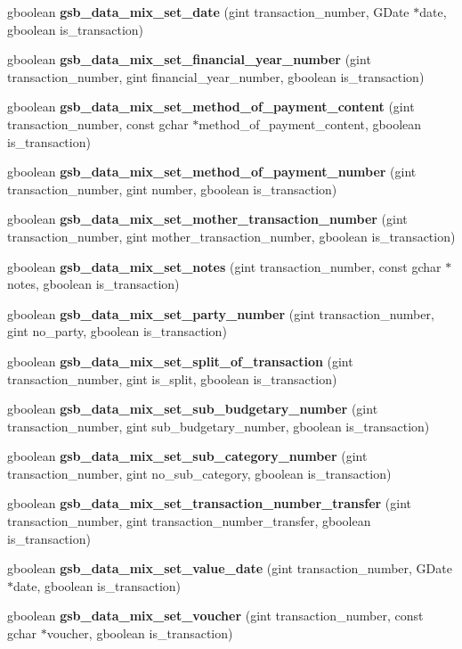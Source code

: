 \begin{DoxyCompactItemize}
\item 
gboolean {\bf gsb\_\-data\_\-mix\_\-set\_\-date} (gint transaction\_\-number, GDate $\ast$date, gboolean is\_\-transaction)
\item 
gboolean {\bf gsb\_\-data\_\-mix\_\-set\_\-financial\_\-year\_\-number} (gint transaction\_\-number, gint financial\_\-year\_\-number, gboolean is\_\-transaction)
\item 
gboolean {\bf gsb\_\-data\_\-mix\_\-set\_\-method\_\-of\_\-payment\_\-content} (gint transaction\_\-number, const gchar $\ast$method\_\-of\_\-payment\_\-content, gboolean is\_\-transaction)
\item 
gboolean {\bf gsb\_\-data\_\-mix\_\-set\_\-method\_\-of\_\-payment\_\-number} (gint transaction\_\-number, gint number, gboolean is\_\-transaction)
\item 
gboolean {\bf gsb\_\-data\_\-mix\_\-set\_\-mother\_\-transaction\_\-number} (gint transaction\_\-number, gint mother\_\-transaction\_\-number, gboolean is\_\-transaction)
\item 
gboolean {\bf gsb\_\-data\_\-mix\_\-set\_\-notes} (gint transaction\_\-number, const gchar $\ast$notes, gboolean is\_\-transaction)
\item 
gboolean {\bf gsb\_\-data\_\-mix\_\-set\_\-party\_\-number} (gint transaction\_\-number, gint no\_\-party, gboolean is\_\-transaction)
\item 
gboolean {\bf gsb\_\-data\_\-mix\_\-set\_\-split\_\-of\_\-transaction} (gint transaction\_\-number, gint is\_\-split, gboolean is\_\-transaction)
\item 
gboolean {\bf gsb\_\-data\_\-mix\_\-set\_\-sub\_\-budgetary\_\-number} (gint transaction\_\-number, gint sub\_\-budgetary\_\-number, gboolean is\_\-transaction)
\item 
gboolean {\bf gsb\_\-data\_\-mix\_\-set\_\-sub\_\-category\_\-number} (gint transaction\_\-number, gint no\_\-sub\_\-category, gboolean is\_\-transaction)
\item 
gboolean {\bf gsb\_\-data\_\-mix\_\-set\_\-transaction\_\-number\_\-transfer} (gint transaction\_\-number, gint transaction\_\-number\_\-transfer, gboolean is\_\-transaction)
\item 
gboolean {\bf gsb\_\-data\_\-mix\_\-set\_\-value\_\-date} (gint transaction\_\-number, GDate $\ast$date, gboolean is\_\-transaction)
\item 
gboolean {\bf gsb\_\-data\_\-mix\_\-set\_\-voucher} (gint transaction\_\-number, const gchar $\ast$voucher, gboolean is\_\-transaction)
\end{DoxyCompactItemize}



